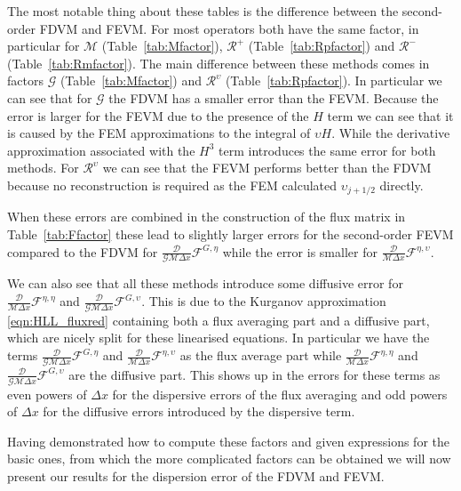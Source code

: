 The most notable thing about these tables is the difference between the second-order FDVM and FEVM. For most operators both have the same factor, in particular for $\mathcal{M}$ (Table~\ref{tab:Mfactor}), $\mathcal{R}^+$ (Table~\ref{tab:Rpfactor}) and $\mathcal{R}^-$ (Table~\ref{tab:Rmfactor}). The main difference between these methods comes in factors $\mathcal{G}$ (Table~\ref{tab:Mfactor}) and $\mathcal{R}^\upsilon$ (Table~\ref{tab:Rpfactor}). In particular we can see that for $\mathcal{G}$ the FDVM has a smaller error than the FEVM. Because the error is larger for the FEVM due to the presence of the $H$ term we can see that it is caused by the FEM approximations to the integral of $\upsilon H$. While the derivative approximation associated with the $H^3$ term introduces the same error for both methods. For $\mathcal{R}^\upsilon$ we can see that the FEVM performs better than the FDVM because no reconstruction is required as the FEM calculated $\upsilon_{j+1/2}$ directly. 

When these errors are combined in the construction of the flux matrix in Table~\ref{tab:Ffactor} these lead to slightly larger errors for the second-order FEVM compared to the FDVM for $\frac{\mathcal{D}}{\mathcal{G}\mathcal{M}\Delta x} \mathcal{F}^{G,\eta}$ while the error is smaller for $\frac{\mathcal{D}}{\mathcal{M}\Delta x} \mathcal{F}^{\eta,\upsilon}$.

We can also see that all these methods introduce some diffusive error for $ \frac{\mathcal{D}}{\mathcal{M}\Delta x}\mathcal{F}^{\eta,\eta}$ and $\frac{\mathcal{D}}{\mathcal{G}\mathcal{M}\Delta x} \mathcal{F}^{G,\upsilon}$. This is due to the Kurganov approximation \eqref{eqn:HLL_fluxred} containing both a flux averaging part and a diffusive part, which are nicely split for these linearised equations. In particular we have the terms $\frac{\mathcal{D}}{\mathcal{G}\mathcal{M}\Delta x} \mathcal{F}^{G,\eta}$ and $\frac{\mathcal{D}}{\mathcal{M}\Delta x} \mathcal{F}^{\eta,\upsilon}$ as the flux average part while  $\frac{\mathcal{D}}{\mathcal{M}\Delta x}\mathcal{F}^{\eta,\eta}$ and $\frac{\mathcal{D}}{\mathcal{G}\mathcal{M}\Delta x} \mathcal{F}^{G,\upsilon}$ are the diffusive part. This shows up in the errors for these terms as even powers of $\Delta x$ for the dispersive errors of the flux averaging and odd powers of $\Delta x$ for the diffusive errors introduced by the dispersive term.

Having demonstrated how to compute these factors and given expressions for the basic ones, from which the more complicated factors can be obtained we will now present our results for the dispersion error of the FDVM and FEVM.

